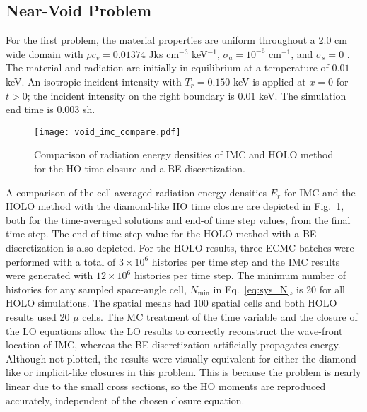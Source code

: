 \subsection{Near-Void Problem}

For the first problem, the material properties
are uniform throughout a 2.0 cm wide domain with $\rho c_v = 0.01374$ Jks cm$^{-3}$ keV$^{-1}$, $\sigma_a=10^{-6}$ cm$^{-1}$, and $\sigma_s=0$ \invcm.
The material and radiation are initially in equilibrium at a temperature of $0.01$ keV.
An isotropic incident intensity with $T_r = 0.150$ keV is applied
at $x=0$ for $t>0$; the incident intensity on the right boundary is $0.01$ keV.  The simulation end
time is 0.003 sh.      
\begin{figure}[H]
  \centering
    \texttt{[image: void\_imc\_compare.pdf]}
    \caption{\label{fig:void_imc_compare} Comparison of radiation energy densities of IMC
    and HOLO method for the HO time closure and a BE discretization.}
\end{figure}

A comparison of the cell-averaged radiation energy densities $E_r$ for IMC and the HOLO
method with the diamond-like HO time closure are depicted in Fig.~\ref{fig:void_imc_compare},
both for the time-averaged solutions and end-of time step values, from the final time
step.  The end of time step value for the HOLO method with a BE discretization is also depicted.
For the HOLO results, three ECMC batches were performed with
a total of $3\times10^6$ histories per time step and the IMC results were generated with
$12\times10^6$ histories per time step. 
The minimum number of histories for any sampled space-angle cell, $N_{\min}$ in
Eq.~\eqref{eq:sys_N}, is 20 for all HOLO simulations.
The spatial meshs had 100 spatial cells and both
HOLO results used 20 $\mu$ cells.  
The MC treatment of the time
variable and the closure of the LO equations allow the LO results to correctly reconstruct
the wave-front location of IMC, whereas the BE discretization artificially propagates
energy.   Although not plotted, the results were visually equivalent for either the diamond-like or implicit-like
closures in this problem.  This is because the problem is nearly linear due to the small
cross sections, so the HO moments are reproduced accurately, independent of the chosen closure
equation.  

